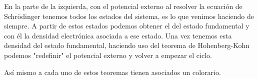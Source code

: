 En la parte de la izquierda, con el potencial externo al resolver la ecuación de Schrödinger tenemos todos los estados del sistema, es lo que venimos haciendo de siempre. A partir de estos estados podemos obtener el del estado fundamental y con él la densidad electrónica asociada a ese estado. Una vez tenemos esta densidad del estado fundamental, haciendo uso del teorema de Hohenberg-Kohn podemos "redefinir" el potencial externo y volver a empezar el ciclo.

Así mismo a cada uno de estos teoremas tienen asociados un colorario.

